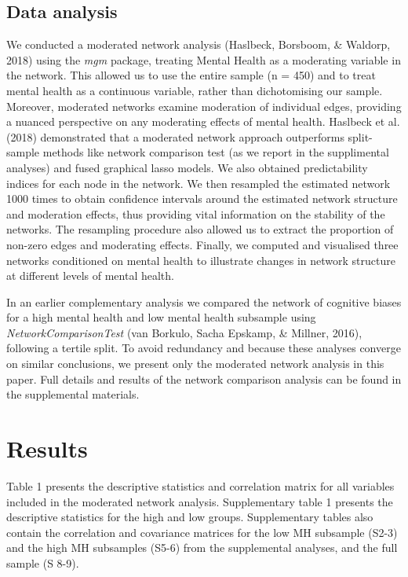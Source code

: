 \documentclass[
  english,
  man]{apa6}
\begin{document}
\hypertarget{data-analysis}{%
\subsection{Data analysis}\label{data-analysis}}

We conducted a moderated network analysis (Haslbeck, Borsboom, \& Waldorp, 2018) using the \emph{mgm} package, treating Mental Health as a moderating variable in the network. This allowed us to use the entire sample (n = 450) and to treat mental health as a continuous variable, rather than dichotomising our sample. Moreover, moderated networks examine moderation of individual edges, providing a nuanced perspective on any moderating effects of mental health. Haslbeck et al. (2018) demonstrated that a moderated network approach outperforms split-sample methods like network comparison test (as we report in the supplimental analyses) and fused graphical lasso models. We also obtained predictability indices for each node in the network. We then resampled the estimated network 1000 times to obtain confidence intervals around the estimated network structure and moderation effects, thus providing vital information on the stability of the networks. The resampling procedure also allowed us to extract the proportion of non-zero edges and moderating effects. Finally, we computed and visualised three networks conditioned on mental health to illustrate changes in network structure at different levels of mental health.

In an earlier complementary analysis we compared the network of cognitive biases for a high mental health and low mental health subsample using \emph{NetworkComparisonTest} (van Borkulo, Sacha Epskamp, \& Millner, 2016), following a tertile split. To avoid redundancy and because these analyses converge on similar conclusions, we present only the moderated network analysis in this paper. Full details and results of the network comparison analysis can be found in the supplemental materials.

\hypertarget{results}{%
\section{Results}\label{results}}

Table 1 presents the descriptive statistics and correlation matrix for all variables included in the moderated network analysis. Supplementary table 1 presents the descriptive statistics for the high and low groups. Supplementary tables also contain the correlation and covariance matrices for the low MH subsample (S2-3) and the high MH subsamples (S5-6) from the supplemental analyses, and the full sample (S 8-9).
\end{document}
